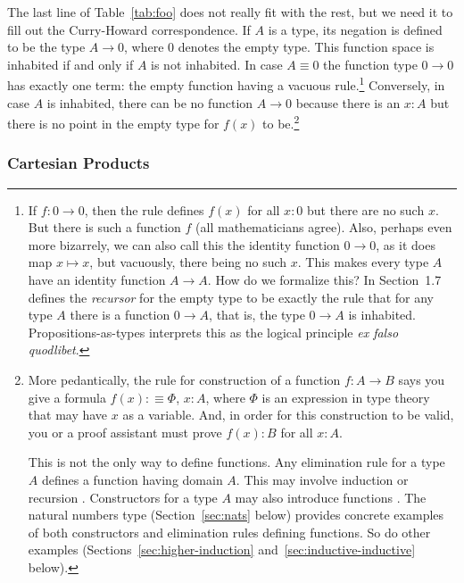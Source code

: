\documentclass[11pt]{article}
\begin{document}
The last line of Table~\ref{tab:foo} does not really fit with the rest,
but we need it to fill out the Curry-Howard correspondence.
If $A$ is a type, its negation
is defined to be the type $A \to 0$, where $0$ denotes the empty type.
This function space is inhabited
if and only if $A$ is not inhabited.  In case $A \equiv 0$ the function
type $0 \to 0$ has exactly one term: the empty function having a vacuous
rule.\footnote{If $f : 0 \to 0$, then the rule
defines $f(x)$ for all $x : 0$ but there are no such $x$.
But there is such a function $f$
(all mathematicians agree).\label{foot:emptyfun}
Also, perhaps even more bizarrely, we can also call this the identity
function $0 \to 0$, as it does map $x \mapsto x$, but vacuously, there
being no such $x$.  This makes every type $A$ have an identity function
$A \to A$.
How do we formalize this?  In Section~1.7 
defines the \emph{recursor} for the empty type to be exactly the rule
that for any type $A$ there is a function $0 \to A$, that is,
the type $0 \to A$ is inhabited.  Propositions-as-types interprets this
as the logical principle \emph{ex falso quodlibet}.}
Conversely, in case $A$ is inhabited, there can be no function $A \to 0$
because there is an $x : A$ but there is no point in the empty type for $f(x)$
to be.\footnote{More pedantically, the rule for construction of a function
$f : A \to B$ says you give a formula $f(x) :\equiv \Phi$, $x : A$, where
$\Phi$ is an expression in type theory that may have $x$ as a variable.
And, in order for this construction to be valid, you or a proof assistant
must prove $f(x) : B$ for all $x : A$.

This is not the only way to define functions.  Any elimination rule
 for a type $A$ defines a function having
domain $A$.  This may involve induction or recursion .  Constructors for a type $A$ may also
introduce functions .  The natural
numbers type (Section~\ref{sec:nats} below) provides concrete examples of
both constructors and elimination rules defining functions.  So do other
examples (Sections~\ref{sec:higher-induction}
and~\ref{sec:inductive-inductive} below).\label{foot:function-construction}}

\subsubsection{Cartesian Products}
\end{document}
